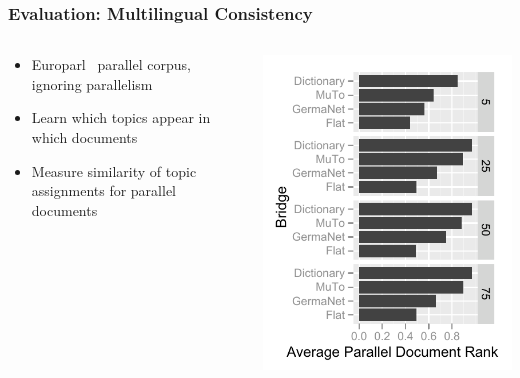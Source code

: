 

\frame
{
  \frametitle{Evaluation: Multilingual Consistency}


\begin{columns}

\begin{block}{}
\begin{itemize}
\item Europarl~\cite{koehn-05} parallel corpus, ignoring parallelism
\item Learn which topics appear in which documents
\item Measure similarity of topic assignments for parallel documents
\end{itemize}
\end{block}

\begin{center}
\includegraphics[width=0.8\linewidth]{mlslda/hellinger}
\end{center}
\end{columns}

}
